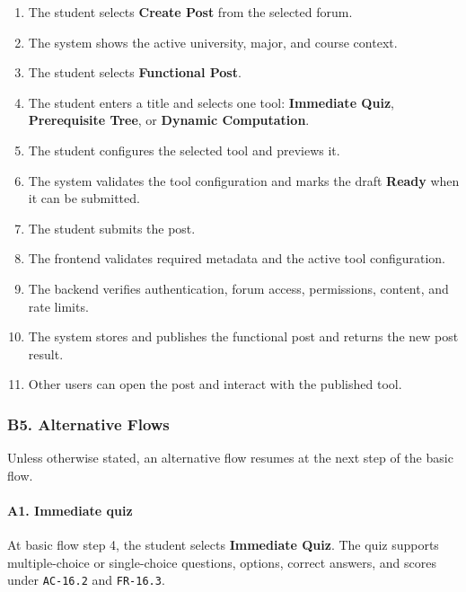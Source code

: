 \documentclass[12pt]{article}
\begin{document}
\begin{enumerate}
\item The student selects \textbf{Create Post} from the selected forum.
\item The system shows the active university, major, and course context.
\item The student selects \textbf{Functional Post}.
\item The student enters a title and selects one tool: \textbf{Immediate Quiz}, \textbf{Prerequisite Tree}, or \textbf{Dynamic Computation}.
\item The student configures the selected tool and previews it.
\item The system validates the tool configuration and marks the draft \textbf{Ready} when it can be submitted.
\item The student submits the post.
\item The frontend validates required metadata and the active tool configuration.
\item The backend verifies authentication, forum access, permissions, content, and rate limits.
\item The system stores and publishes the functional post and returns the new post result.
\item Other users can open the post and interact with the published tool.
\end{enumerate}
\par\medskip

\hypertarget{sec:b5-alternative-flows}{}
\subsubsection*{B5. Alternative Flows}
\par\medskip

Unless otherwise stated, an alternative flow resumes at the next step of the basic flow.
\par\medskip

\hypertarget{sec:a1-immediate-quiz}{}
\paragraph*{A1. Immediate quiz}
\par\medskip

At basic flow step 4, the student selects \textbf{Immediate Quiz}. The quiz supports multiple-choice or single-choice questions, options, correct answers, and scores under \texttt{AC-16.2} and \texttt{FR-16.3}.
\par\medskip
\end{document}
